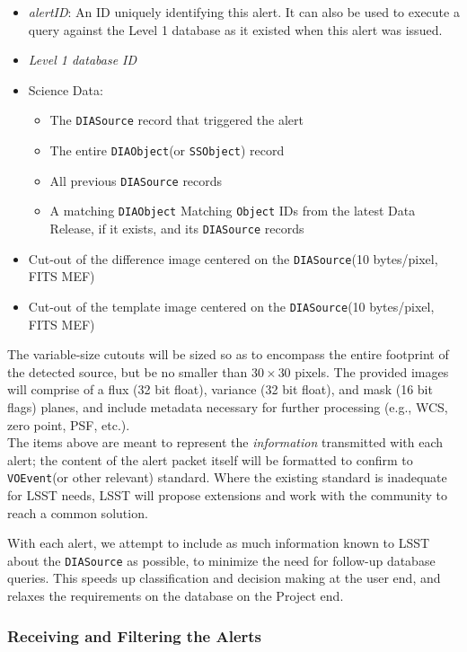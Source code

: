 \documentclass[12pt]{article}
\newcommand{\B}[1]{{\color{blue} #1}}
\newcommand{\R}[1]{{\color{red} #1}}
\newcommand{\code}[1]{\texttt{#1}}
\newcommand{\DIASource}{\code{DIASource}\xspace}
\newcommand{\DIAObject}{\code{DIAObject}\xspace}
\newcommand{\DB}{{Level 1 database}\xspace}
\newcommand{\Object}{\code{Object}\xspace}
\newcommand{\SSObject}{\code{SSObject}\xspace}
\newcommand{\VOEvent}{\code{VOEvent}\xspace}
\newcommand{\req}[1]{\marginpar{\tiny #1}}
\newcommand{\dmreq}[1]{\req{DMS-REQ-#1}}
\begin{document}
\begin{itemize}
\item \emph{alertID}: An ID uniquely identifying this alert. It can also be used to execute a query against the \DB as it existed when this alert was issued.\dmreq{0274}
\item \emph{\DB ID}   %
\item Science Data:
    \begin{itemize}
    \item The \DIASource record that triggered the alert
    \item The entire \DIAObject (or \SSObject) record
    \item All previous \DIASource records
    \item \R{A matching \DIAObject} \B{Matching \Object IDs} from the latest Data Release, if it exists, and its \DIASource records
    \end{itemize}
\item Cut-out of the difference image centered on the \DIASource (10 bytes/pixel, FITS MEF)
\item Cut-out of the template image centered on the \DIASource (10 bytes/pixel, FITS MEF)
\end{itemize}

The variable-size cutouts will be sized so as to encompass the entire footprint of the detected source, but be no smaller than $30 \times 30$ pixels. The provided images will comprise of a flux (32 bit float), variance (32 bit float), and mask (16 bit flags) planes, and include metadata necessary for further processing (e.g., WCS, zero point, PSF, etc.).
\\

The items above are meant to represent the \emph{information} transmitted with each alert; the content of the alert packet itself will be formatted to confirm to \VOEvent (or other relevant) standard. Where the existing standard is inadequate for LSST needs, LSST will propose extensions and work with the community to reach a common solution.

With each alert, we attempt to include as much information known to LSST about the \DIASource as possible, to minimize the need for follow-up database queries. This speeds up classification and decision making at the user end, and relaxes the requirements on the database on the Project end.

\subsubsection{Receiving and Filtering the Alerts}
\label{sec:eventbrokers}
\end{document}
